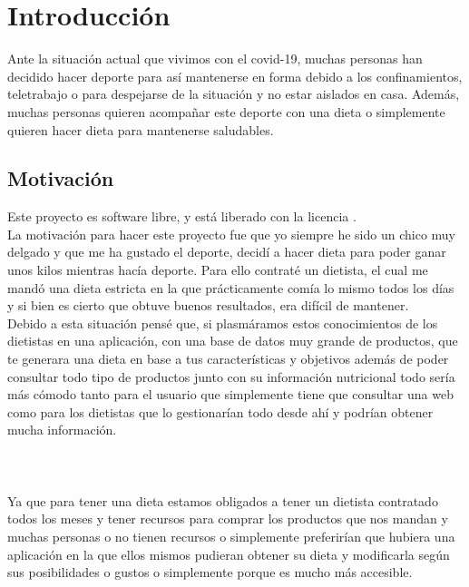 \chapter{Introducción} \label{sec:introduccion}

Ante la situación actual que vivimos con el covid-19, muchas personas han decidido hacer deporte 
para así mantenerse en forma debido a los confinamientos, teletrabajo o para despejarse de la 
situación y no estar aislados en casa. Además, muchas personas quieren acompañar este deporte con una dieta o simplemente quieren hacer 
dieta para mantenerse saludables.

\section{Motivación} \label{sec:motivacion}

Este proyecto es software libre, y está liberado con la licencia \cite{gplv3}.\\

La motivación para hacer este proyecto fue que yo siempre he sido un chico muy delgado y que 
me ha gustado el deporte, decidí a hacer dieta para poder ganar unos kilos mientras hacía deporte.
Para ello contraté un dietista, el cual me mandó una dieta estricta en la que prácticamente comía lo mismo 
todos los días y si bien es cierto que obtuve buenos resultados, era difícil de mantener. \\

Debido a esta situación pensé que, si plasmáramos estos conocimientos de los dietistas en una aplicación, con una base de datos 
muy grande de productos, que te generara una dieta en base a tus características y objetivos 
además de poder consultar todo tipo de productos junto con su información nutricional todo sería más cómodo tanto para
el usuario que simplemente tiene que consultar una web como para los dietistas que lo gestionarían todo desde ahí
y podrían obtener mucha información. \\ \\
\\\\
Ya que para tener una dieta estamos obligados a tener un dietista contratado todos los meses y tener recursos para 
comprar los productos que nos mandan y muchas personas o no tienen recursos o simplemente preferirían
que hubiera una aplicación en la que ellos mismos pudieran obtener su dieta y modificarla según sus 
posibilidades o gustos o simplemente porque es mucho más accesible.

